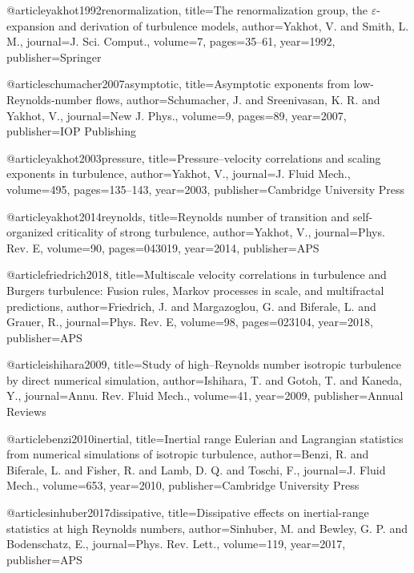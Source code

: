   @article{yakhot1992renormalization,
    title={{The renormalization group, the $\varepsilon$-expansion and derivation of turbulence models}},
    author={Yakhot, V. and Smith, L. M.},
    journal={J. Sci. Comput.},
    volume={7},
    pages={35--61},
    year={1992},
    publisher={Springer}
  }

  @article{schumacher2007asymptotic,
    title={{Asymptotic exponents from low-Reynolds-number flows}},
    author={Schumacher, J. and Sreenivasan, K. R. and Yakhot, V.},
    journal={New J. Phys.},
    volume={9},
    pages={89},
    year={2007},
    publisher={IOP Publishing}
  }

  @article{yakhot2003pressure,
    title={{Pressure--velocity correlations and scaling exponents in turbulence}},
    author={Yakhot, V.},
    journal={J. Fluid Mech.},
    volume={495},
    pages={135--143},
    year={2003},
    publisher={Cambridge University Press}
  }

  @article{yakhot2014reynolds,
    title={{Reynolds number of transition and self-organized criticality of strong turbulence}},
    author={Yakhot, V.},
    journal={Phys. Rev. E},
    volume={90},
    pages={043019},
    year={2014},
    publisher={APS}
  }

  @article{friedrich2018,
    title={{Multiscale velocity correlations in turbulence and Burgers turbulence: Fusion rules, Markov processes in scale, and multifractal predictions}},
    author={Friedrich, J. and Margazoglou, G. and Biferale, L. and Grauer, R.},
    journal={Phys. Rev. E},
    volume={98},
    pages={023104},
    year={2018},
    publisher={APS}
  }

  @article{ishihara2009,
    title={{Study of high--Reynolds number isotropic turbulence by direct numerical simulation}},
    author={Ishihara, T. and Gotoh, T. and Kaneda, Y.},
    journal={Annu. Rev. Fluid Mech.},
    volume={41},
    year={2009},
    publisher={Annual Reviews}
  }

  @article{benzi2010inertial,
    title={{Inertial range Eulerian and Lagrangian statistics from numerical simulations of isotropic turbulence}},
    author={Benzi, R. and Biferale, L. and Fisher, R. and Lamb, D. Q. and Toschi, F.},
    journal={J. Fluid Mech.},
    volume={653},
    year={2010},
    publisher={Cambridge University Press}
  }


  @article{sinhuber2017dissipative,
    title={{Dissipative effects on inertial-range statistics at high Reynolds numbers}},
    author={Sinhuber, M. and Bewley, G. P. and Bodenschatz, E.},
    journal={Phys. Rev. Lett.},
    volume={119},
    year={2017},
    publisher={APS}
  }

